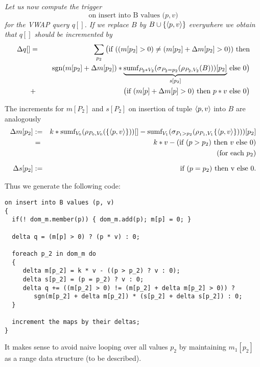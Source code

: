 \begin{example}\em
Let us now compute the trigger
\[
\mbox{on insert into B values ($p, v$)}
\]
for the VWAP query $q[]$.
If we replace $B$ by $B \cup \{{\langle p, v\rangle}\}$ everywhere
%
we obtain that $q[]$ should be incremented by
%
\begin{eqnarray*}
\Delta q[] &=&
\sum_{p_2}
\big( \mbox{if ($(m[p_2] > 0) \neq (m[p_2] + \Delta m[p_2] > 0))$ then}
\\
&& ~~~
      \mbox{$\mbox{sgn}(m[p_2] + \Delta m[p_2]) *
      \underbrace{\mbox{sumf}_{P_2 * V_2}(\sigma_{P_2=p_2}(\rho_{P_2,V_2}(B)))[p_2]}_{s[p_2]}$ else 0} \big)
\\
&+&
\big( \mbox{if $(m[p] + \Delta m[p] > 0)$ then $p * v$ else $0$} \big)
\end{eqnarray*}

The increments for $m[P_2]$ and $s[P_2]$
on insertion of tuple ${\langle p,v\rangle}$ into $B$ are
analogously
\begin{eqnarray*}
\Delta m[p_2] &:=&
k * \mbox{sumf}_{V_0}(\rho_{P_0, V_0}(\{{\langle p, v\rangle}\}))[] -
\mbox{sumf}_{V_1}(\sigma_{P_1 > p_2}(\rho_{P_1, V_1}\{{\langle p, v\rangle}\})))[p_2]
\\
&=& k * v - (\mbox{if $(p > p_2)$ then $v$ else $0$)}
\\
&& (\mbox{for each $p_2$})
\\[1.5ex]
\Delta s[p_2] &:=& \mbox{if $(p = p_2)$ then v else 0}.
\end{eqnarray*}

Thus we generate the following code:
\begin{verbatim}
on insert into B values (p, v)
{
  if(! dom_m.member(p)) { dom_m.add(p); m[p] = 0; }

  delta q = (m[p] > 0) ? (p * v) : 0;

  foreach p_2 in dom_m do
  {
     delta m[p_2] = k * v - ((p > p_2) ? v : 0);
     delta s[p_2] = (p = p_2) ? v : 0;
     delta q += ((m[p_2] > 0) != (m[p_2] + delta m[p_2] > 0)) ?
        sgn(m[p_2] + delta m[p_2]) * (s[p_2] + delta s[p_2]) : 0;
  }

  increment the maps by their deltas;
}
\end{verbatim}


It makes sense to avoid naive looping over all values $p_2$ by maintaining
$m_1[p_2]$ as a range data structure (to be described).
\punto
\end{example}







